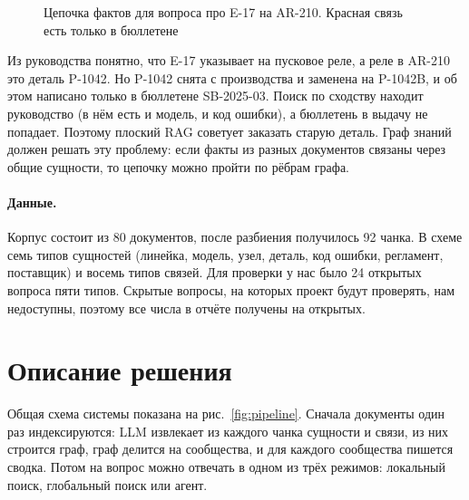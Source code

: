 \documentclass[a4paper,12pt]{article}
\begin{document}
\begin{figure}[H]
\centering
{}
\caption{Цепочка фактов для вопроса про E-17 на AR-210. Красная связь есть только в бюллетене}
\label{fig:chain}
\end{figure}

Из руководства понятно, что E-17 указывает на пусковое реле, а реле в AR-210 это деталь P-1042. Но P-1042 снята с производства и заменена на P-1042B, и об этом написано только в бюллетене SB-2025-03. Поиск по сходству находит руководство (в нём есть и модель, и код ошибки), а бюллетень в выдачу не попадает. Поэтому плоский RAG советует заказать старую деталь. Граф знаний должен решать эту проблему: если факты из разных документов связаны через общие сущности, то цепочку можно пройти по рёбрам графа.

\paragraph{Данные.} Корпус состоит из 80 документов, после разбиения получилось 92 чанка. В схеме семь типов сущностей (линейка, модель, узел, деталь, код ошибки, регламент, поставщик) и восемь типов связей. Для проверки у нас было 24 открытых вопроса пяти типов. Скрытые вопросы, на которых проект будут проверять, нам недоступны, поэтому все числа в отчёте получены на открытых.

\section{Описание решения}

Общая схема системы показана на рис.~\ref{fig:pipeline}. Сначала документы один раз индексируются: LLM извлекает из каждого чанка сущности и связи, из них строится граф, граф делится на сообщества, и для каждого сообщества пишется сводка. Потом на вопрос можно отвечать в одном из трёх режимов: локальный поиск, глобальный поиск или агент.
\end{document}
